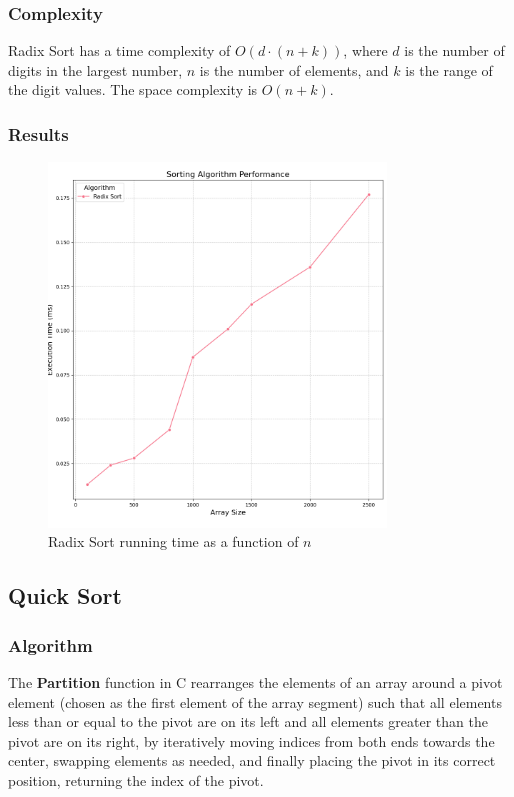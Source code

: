 \documentclass{article}
\begin{document}
\subsubsection{Complexity}
Radix Sort has a time complexity of $O(d \cdot (n + k))$, where $d$ is the number of digits in the largest number, $n$ is the number of elements, and $k$ is the range of the digit values. The space complexity is $O(n + k)$.

\subsubsection{Results}
\begin{figure}[H]
	\includegraphics[width=0.8\textwidth]{images/radix_sort.png}
	\caption{Radix Sort running time as a function of $n$}
\end{figure}


\subsection{Quick Sort}

\subsubsection{Algorithm}
The \textbf{Partition} function in C rearranges the elements of an array around a pivot element (chosen as the first element of the array segment) such that all elements less than or equal to the pivot are on its left and all elements greater than the pivot are on its right, by iteratively moving indices from both ends towards the center, swapping elements as needed, and finally placing the pivot in its correct position, returning the index of the pivot.
\end{document}
